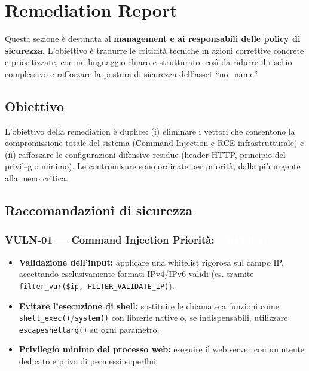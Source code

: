 \documentclass[11pt]{article}
\newcommand{\sev}[2]{%
  \setlength{\fboxsep}{3pt}%
  \colorbox{#1}{\textcolor{white}{\small\textbf{#2}}}%
}
\newcommand{\sevCRIT}{\sev{sevCritico}{CRITICO}}
\begin{document}
\section{Remediation Report}
Questa sezione è destinata al \textbf{management e ai responsabili delle policy di sicurezza}. L'obiettivo è tradurre le criticità tecniche in azioni correttive concrete e prioritizzate, con un linguaggio chiaro e strutturato, così da ridurre il rischio complessivo e rafforzare la postura di sicurezza dell'asset ``no\_name''.

\subsection{Obiettivo}
L'obiettivo della remediation è duplice: (i) eliminare i vettori che consentono la compromissione totale del sistema (Command Injection e RCE infrastrutturale) e (ii) rafforzare le configurazioni difensive residue (header HTTP, principio del privilegio minimo). Le contromisure sono ordinate per priorità, dalla più urgente alla meno critica.

\subsection{Raccomandazioni di sicurezza}

\subsubsection{VULN-01 — Command Injection \hfill Priorità: \sevCRIT}
\begin{itemize}[leftmargin=*]
    \item \textbf{Validazione dell'input:} applicare una whitelist rigorosa sul campo IP, accettando esclusivamente formati IPv4/IPv6 validi (es. tramite \texttt{filter\_var(\$ip, FILTER\_VALIDATE\_IP)}).
    \item \textbf{Evitare l'esecuzione di shell:} sostituire le chiamate a funzioni come \texttt{shell\_exec()}/\texttt{system()} con librerie native o, se indispensabili, utilizzare \texttt{escapeshellarg()} su ogni parametro.
    \item \textbf{Privilegio minimo del processo web:} eseguire il web server con un utente dedicato e privo di permessi superflui.
\end{itemize}
\end{document}
